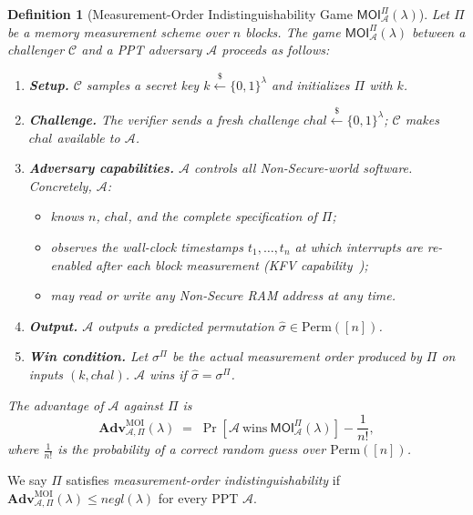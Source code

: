 \documentclass[journal]{IEEEtran}
\newtheorem{definition}{Definition}
\newcommand{\Adv}{\mathbf{Adv}}
\begin{document}
\begin{definition}[Measurement-Order Indistinguishability Game
  $\mathsf{MOI}^{\Pi}_{\mathcal{A}}(\lambda)$]
\label{def:moi-game}
Let $\Pi$ be a memory measurement scheme over $n$ blocks.
The game $\mathsf{MOI}^{\Pi}_{\mathcal{A}}(\lambda)$ between a challenger
$\mathcal{C}$ and a PPT adversary $\mathcal{A}$ proceeds as follows:
\begin{enumerate}
  \item \textbf{Setup.}
    $\mathcal{C}$ samples a secret key
    $k \xleftarrow{\$} \{0,1\}^{\lambda}$ and initializes $\Pi$ with $k$.
  \item \textbf{Challenge.}
    The verifier sends a fresh challenge
    $\mathit{chal} \xleftarrow{\$} \{0,1\}^{\lambda}$;
    $\mathcal{C}$ makes $\mathit{chal}$ available to $\mathcal{A}$.
  \item \textbf{Adversary capabilities.}
    $\mathcal{A}$ controls all Non-Secure-world software.
    Concretely, $\mathcal{A}$:
    \begin{itemize}
      \item knows $n$, $\mathit{chal}$, and the complete specification of $\Pi$;
      \item observes the wall-clock timestamps $t_1,\dots,t_n$ at which interrupts are re-enabled after each block measurement (KFV capability~\cite{smarm});
      \item may read or write any Non-Secure RAM address at any time.
    \end{itemize}
  \item \textbf{Output.}
    $\mathcal{A}$ outputs a predicted permutation
    $\hat{\sigma} \in \mathrm{Perm}([n])$.
  \item \textbf{Win condition.}
    Let $\sigma^{\Pi}$ be the actual measurement order produced by $\Pi$
    on inputs $(k, \mathit{chal})$.
    $\mathcal{A}$ wins if $\hat{\sigma} = \sigma^{\Pi}$.
\end{enumerate}
The advantage of $\mathcal{A}$ against $\Pi$ is
\[
  \Adv^{\mathrm{MOI}}_{\mathcal{A},\Pi}(\lambda)
  \;=\; \Pr\!\left[\mathcal{A}\ \text{wins}\ \mathsf{MOI}^{\Pi}_{\mathcal{A}}(\lambda)\right]
  - \frac{1}{n!},
\]
where $\frac{1}{n!}$ is the probability of a correct random guess over
$\mathrm{Perm}([n])$.
\end{definition}
 
We say $\Pi$ satisfies \emph{measurement-order indistinguishability} if
$\Adv^{\mathrm{MOI}}_{\mathcal{A},\Pi}(\lambda) \leq \mathit{negl}(\lambda)$
for every PPT $\mathcal{A}$.
 
\end{document}
